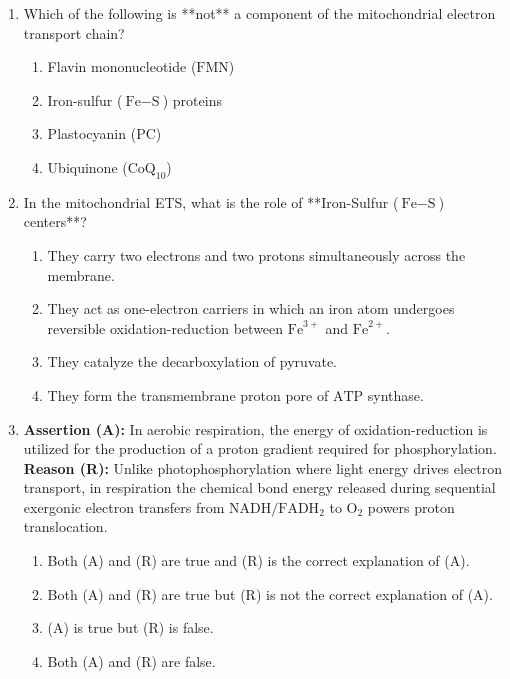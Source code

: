 \documentclass[11pt, a4paper]{article}
\begin{document}
\begin{enumerate}[label=\textbf{\arabic*.}]
\item Which of the following is **not** a component of the mitochondrial electron transport chain?
\begin{enumerate}[label=(\Alph*)]
    \item Flavin mononucleotide ($\text{FMN}$)
    \item Iron-sulfur ($\text{Fe}-\text{S}$) proteins
    \item Plastocyanin ($\text{PC}$)
    \item Ubiquinone ($\text{CoQ}_{10}$)
\end{enumerate}

\item In the mitochondrial ETS, what is the role of **Iron-Sulfur ($\text{Fe}-\text{S}$) centers**?
\begin{enumerate}[label=(\Alph*)]
    \item They carry two electrons and two protons simultaneously across the membrane.
    \item They act as one-electron carriers in which an iron atom undergoes reversible oxidation-reduction between $\text{Fe}^{3+}$ and $\text{Fe}^{2+}$.
    \item They catalyze the decarboxylation of pyruvate.
    \item They form the transmembrane proton pore of $\text{ATP}$ synthase.
\end{enumerate}

\item \textbf{Assertion (A):} In aerobic respiration, the energy of oxidation-reduction is utilized for the production of a proton gradient required for phosphorylation. \\
\textbf{Reason (R):} Unlike photophosphorylation where light energy drives electron transport, in respiration the chemical bond energy released during sequential exergonic electron transfers from $\text{NADH}/\text{FADH}_2$ to $\text{O}_2$ powers proton translocation.
\begin{enumerate}[label=(\Alph*)]
    \item Both (A) and (R) are true and (R) is the correct explanation of (A).
    \item Both (A) and (R) are true but (R) is not the correct explanation of (A).
    \item (A) is true but (R) is false.
    \item Both (A) and (R) are false.
\end{enumerate}


\end{enumerate}
\end{document}
